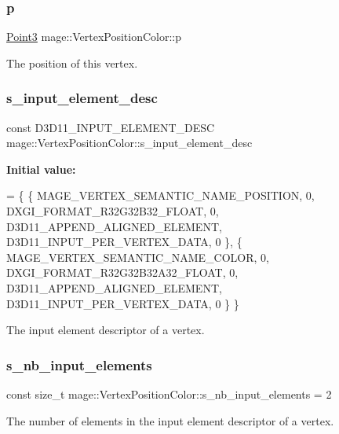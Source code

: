 \subsubsection{\texorpdfstring{p}{p}}
{\footnotesize\ttfamily \hyperlink{structmage_1_1_point3}{Point3} mage\+::\+Vertex\+Position\+Color\+::p}

The position of this vertex. \hypertarget{structmage_1_1_vertex_position_color_a0cc09950718850b64339c5fd5130ff9a}{}\label{structmage_1_1_vertex_position_color_a0cc09950718850b64339c5fd5130ff9a} 
\subsubsection{\texorpdfstring{s\+\_\+input\+\_\+element\+\_\+desc}{s\_input\_element\_desc}}
{\footnotesize\ttfamily const D3\+D11\+\_\+\+I\+N\+P\+U\+T\+\_\+\+E\+L\+E\+M\+E\+N\+T\+\_\+\+D\+E\+SC mage\+::\+Vertex\+Position\+Color\+::s\+\_\+input\+\_\+element\+\_\+desc\hspace{0.3cm}{\ttfamily [static]}}

{\bfseries Initial value\+:}
\begin{DoxyCode}
= \{
        \{ MAGE\_VERTEX\_SEMANTIC\_NAME\_POSITION, 0, DXGI\_FORMAT\_R32G32B32\_FLOAT,    0, 
      D3D11\_APPEND\_ALIGNED\_ELEMENT, D3D11\_INPUT\_PER\_VERTEX\_DATA, 0 \},
        \{ MAGE\_VERTEX\_SEMANTIC\_NAME\_COLOR,    0, DXGI\_FORMAT\_R32G32B32A32\_FLOAT, 0, 
      D3D11\_APPEND\_ALIGNED\_ELEMENT, D3D11\_INPUT\_PER\_VERTEX\_DATA, 0 \}
    \}
\end{DoxyCode}
The input element descriptor of a vertex. \hypertarget{structmage_1_1_vertex_position_color_ab59f4ce0c11158a904232371f8f7bbd1}{}\label{structmage_1_1_vertex_position_color_ab59f4ce0c11158a904232371f8f7bbd1} 
\subsubsection{\texorpdfstring{s\+\_\+nb\+\_\+input\+\_\+elements}{s\_nb\_input\_elements}}
{\footnotesize\ttfamily const size\+\_\+t mage\+::\+Vertex\+Position\+Color\+::s\+\_\+nb\+\_\+input\+\_\+elements = 2\hspace{0.3cm}{\ttfamily [static]}}

The number of elements in the input element descriptor of a vertex. 